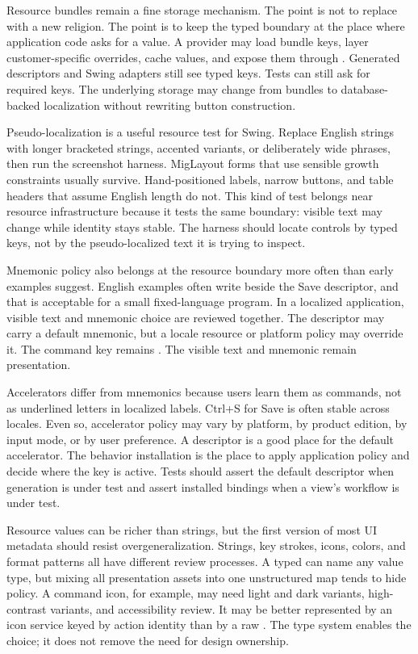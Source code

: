 Resource bundles remain a fine storage mechanism. The point is not to replace
 with a new religion. The point is to keep the typed
boundary at the place where application code asks for a value. A provider may
load bundle keys, layer customer-specific overrides, cache values, and expose
them through . Generated descriptors and Swing adapters still
see typed keys. Tests can still ask for required keys. The underlying storage
may change from bundles to database-backed localization without rewriting
button construction.

Pseudo-localization is a useful resource test for Swing. Replace English
strings with longer bracketed strings, accented variants, or deliberately wide
phrases, then run the screenshot harness. MigLayout forms that use sensible
growth constraints usually survive. Hand-positioned labels, narrow buttons,
and table headers that assume English length do not. This kind of test belongs
near resource infrastructure because it tests the same boundary: visible text
may change while identity stays stable. The harness should locate controls by
typed keys, not by the pseudo-localized text it is trying to inspect.

Mnemonic policy also belongs at the resource boundary more often than early
examples suggest. English examples often write  beside the
Save descriptor, and that is acceptable for a small fixed-language program.
In a localized application, visible text and mnemonic choice are reviewed
together. The descriptor may carry a default mnemonic, but a locale resource
or platform policy may override it. The command key remains
. The visible text and mnemonic remain presentation.

Accelerators differ from mnemonics because users learn them as commands, not
as underlined letters in localized labels. Ctrl+S for Save is often stable
across locales. Even so, accelerator policy may vary by platform, by product
edition, by input mode, or by user preference. A descriptor is a good place
for the default accelerator. The behavior installation is the place to apply
application policy and decide where the key is active. Tests should assert the
default descriptor when generation is under test and assert installed bindings
when a view's workflow is under test.

Resource values can be richer than strings, but the first version of most UI
metadata should resist overgeneralization. Strings, key strokes, icons, colors,
and format patterns all have different review processes. A typed
 can name any value type, but mixing all presentation
assets into one unstructured map tends to hide policy. A command icon, for
example, may need light and dark variants, high-contrast variants, and
accessibility review. It may be better represented by an icon service keyed by
action identity than by a raw . The type system enables
the choice; it does not remove the need for design ownership.

